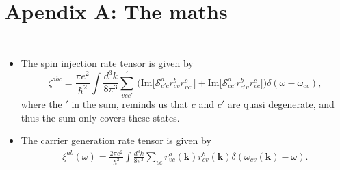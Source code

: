 \documentclass{beamer}
\begin{document}

\begin{frame}

\end{frame}




\section{Apendix A: The maths} 


{

\begin{frame}[noframenumbering]

\begin{columns}


\begin{itemize}

\item 
The spin injection rate tensor is given by
\begin{equation}
\zeta^{abc}
=
\frac{\pi e^2}{\hbar^2}
\int\frac{d^3k}{8\pi^3}
\sum_{vcc'}^\prime\,
\Big(
\mbox{Im}\big[
{\mathcal S}^a_{c'c}r^b_{cv}r^c_{vc'}
\big]
+
\mbox{Im}\big[
{\mathcal S}^a_{cc'}r^b_{c'v}r^c_{vc}
\big]
\Big)
\delta(\omega-\omega_{cv})
,
\end{equation}
where the $'$ in the sum, reminds us that $c$ and $c'$ are quasi
degenerate, and thus the sum only covers these states.

\item 
The carrier generation rate tensor is given by 
\begin{eqnarray}\label{xib}
\xi^{ab}(\omega)  
=
\frac{2\pi e^2}{\hbar^2}
\int\frac{d^3k}{8\pi^3}
\sum_{vc} 
r^a_{vc}(\mathbf{k}) r^b_{cv}(\mathbf{k})  
\delta(\omega_{cv}(\mathbf{k})-\omega) 
.
\end{eqnarray}   

\end{itemize}

\end{columns}

\end{frame}

}
\end{document}
